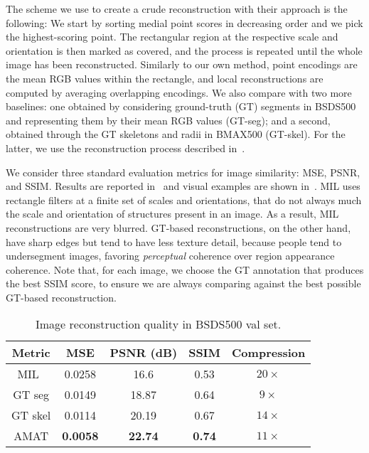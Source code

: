 \documentclass[10pt,twocolumn,letterpaper]{article}
\begin{document}
The scheme we use to create a crude reconstruction with their approach is the following:
We start by sorting medial point scores in decreasing order and we pick the highest-scoring point.
The rectangular region at the respective scale and orientation is then marked as covered,
and the process is repeated until the whole image has been reconstructed.
Similarly to our own method, point encodings are the mean RGB values within the rectangle, 
and local reconstructions are computed by averaging overlapping encodings.
We also compare with two more baselines: one obtained by considering ground-truth (GT) segments in BSDS500
and representing them by their mean RGB values (GT-seg); 
and a second, obtained through the GT skeletons and radii in BMAX500 (GT-skel).
For the latter, we use the reconstruction process described in~.

We consider three standard evaluation metrics for image similarity: MSE, PSNR, and SSIM.
Results are reported in~ and visual examples are shown
in~.
MIL uses rectangle filters at a finite set of scales and orientations, that do not always much 
the scale and orientation of structures present in an image.
As a result, MIL reconstructions are very blurred.
GT-based reconstructions, on the other hand, have sharp edges but tend to have less
texture detail, because people tend to undersegment images, favoring \emph{perceptual} coherence 
over region appearance coherence.
Note that, for each image, we choose the GT annotation that produces the best SSIM score, 
to ensure we are always comparing against the best possible GT-based reconstruction.

\begin{table}
\centering
\begin{tabular}{|c|c|c|c|c|}
\hline
Metric	&	MSE		&	PSNR (dB)	&	SSIM	&	Compression 	\\
\hline
MIL~\cite{tsogkas2012learning}	&	0.0258	& 	16.6 	& 	0.53	&	$20\times$	\\
\hline
GT seg	&	0.0149	& 	18.87 	& 	0.64	&	$9\times$\\
\hline
GT skel &	0.0114	& 	20.19 	& 	0.67	&	$14\times$\\
\hline
AMAT	&	\textbf{0.0058}	&	\textbf{22.74}	&	\textbf{0.74}	&	$11\times$	\\
\hline
\end{tabular}
\caption{Image reconstruction quality in BSDS500 val set.}
\label{tab:experiments:reconstruction}
\end{table}
\end{document}
